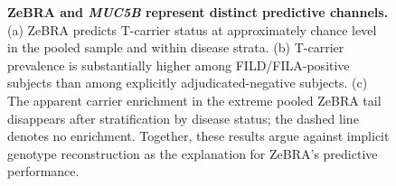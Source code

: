 {\begin{figure}[!t]
\caption{\textbf{ZeBRA and \textit{MUC5B} represent distinct predictive channels.} (a) ZeBRA predicts T-carrier status at approximately chance level in the pooled sample and within disease strata. (b) T-carrier prevalence is substantially higher among FILD/FILA-positive subjects than among explicitly adjudicated-negative subjects. (c) The apparent carrier enrichment in the extreme pooled ZeBRA tail disappears after stratification by disease status; the dashed line denotes no enrichment. Together, these results argue against implicit genotype reconstruction as the explanation for ZeBRA's predictive performance.}
\label{fig:muc5b-apparent-stratified}
\end{figure}%
}

